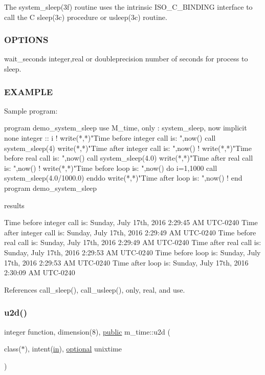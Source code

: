 \begin{DoxyVerb}
The system\+\_\+sleep(3f) routine uses the intrinsic I\+S\+O\+\_\+\+C\+\_\+\+B\+I\+N\+D\+I\+NG interface to call the C sleep(3c) procedure or usleep(3c) routine.

\subsubsection*{O\+P\+T\+I\+O\+NS}

wait\+\_\+seconds integer,real or doubleprecision number of seconds for process to sleep.

\subsubsection*{E\+X\+A\+M\+P\+LE}

\begin{DoxyVerb}Sample program:

 program demo_system_sleep
 use M_time, only : system_sleep, now
 implicit none
 integer :: i
    !
    write(*,*)"Time before integer call is: ",now()
    call system_sleep(4)
    write(*,*)"Time after  integer call is: ",now()
    !
    write(*,*)"Time before real call is: ",now()
    call system_sleep(4.0)
    write(*,*)"Time after  real call is: ",now()
    !
    write(*,*)"Time before loop is: ",now()
    do i=1,1000
       call system_sleep(4.0/1000.0)
    enddo
    write(*,*)"Time after loop  is: ",now()
    !
 end program demo_system_sleep

results

 Time before integer call is: Sunday, July 17th, 2016 2:29:45 AM UTC-0240
 Time after integer call is: Sunday, July 17th, 2016 2:29:49 AM UTC-0240
 Time before real call is: Sunday, July 17th, 2016 2:29:49 AM UTC-0240
 Time after  real call is: Sunday, July 17th, 2016 2:29:53 AM UTC-0240
 Time before loop is: Sunday, July 17th, 2016 2:29:53 AM UTC-0240
 Time after loop  is: Sunday, July 17th, 2016 2:30:09 AM UTC-0240 \end{DoxyVerb}
 

References call\+\_\+sleep(), call\+\_\+usleep(), only, real, and use.

\mbox{\label{namespacem__time_a083bc231f8ba1879d7f86ab424e77d6c}} 
\subsubsection{\texorpdfstring{u2d()}{u2d()}}
{\footnotesize\ttfamily integer function, dimension(8), \hyperlink{M__stopwatch_83_8txt_a2f74811300c361e53b430611a7d1769f}{public} m\+\_\+time\+::u2d (\begin{DoxyParamCaption}\item[{class($\ast$), intent(\hyperlink{M__journal_83_8txt_afce72651d1eed785a2132bee863b2f38}{in}), \hyperlink{option__stopwatch_83_8txt_aa4ece75e7acf58a4843f70fe18c3ade5}{optional}}]{unixtime }\end{DoxyParamCaption})}




\end{DoxyVerb}
